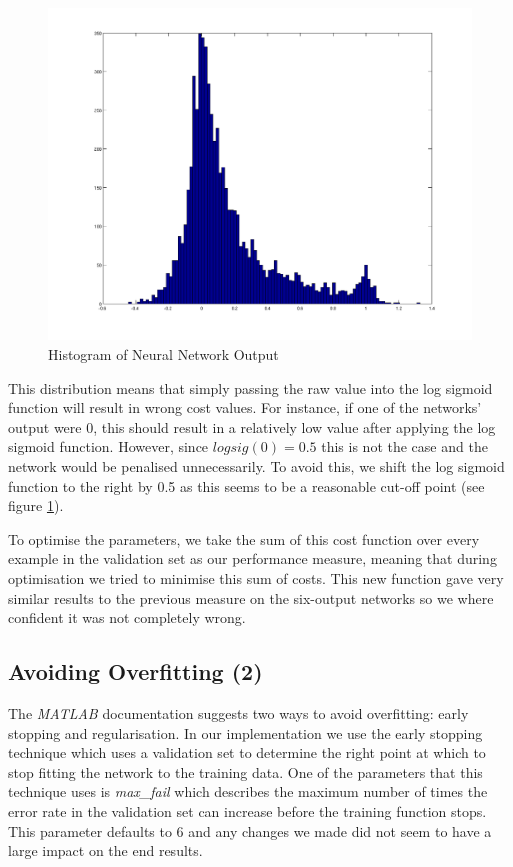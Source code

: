 \documentclass[10pt,a4paper]{article}
\begin{document}
\begin{figure}[!ht]
     \centering
     \includegraphics[scale=0.3]{../../images/clean_hist.png}
     \caption{Histogram of Neural Network Output}
     \label{fig:examplesDistribution}
\end{figure}

This distribution means that simply passing the raw value into the log sigmoid function will result in wrong cost values. For instance, if one of the networks' output were 0, this should result in a relatively low value after applying the log sigmoid function. However, since $logsig(0) = 0.5$ this is not the case and the network would be penalised unnecessarily. To avoid this, we shift the log sigmoid function to the right by 0.5 as this seems to be a reasonable cut-off point (see figure \ref{fig:examplesDistribution}).

To optimise the parameters, we take the sum of this cost function over every example in the validation set as our performance measure, meaning that during optimisation we tried to minimise this sum of costs. This new function gave very similar results to the previous measure on the six-output networks so we where confident it was not completely wrong.

\subsection{Avoiding Overfitting (2)}
The \emph{MATLAB} documentation suggests two ways to avoid overfitting: early stopping and regularisation. In our implementation we use the early stopping technique which uses a validation set to determine the right point at which to stop fitting the network to the training data. One of the parameters that this technique uses is \emph{max\_fail} which describes the maximum number of times the error rate in the validation set can increase before the training function stops. This parameter defaults to 6 and any changes we made did not seem to have a large impact on the end results.
\end{document}
